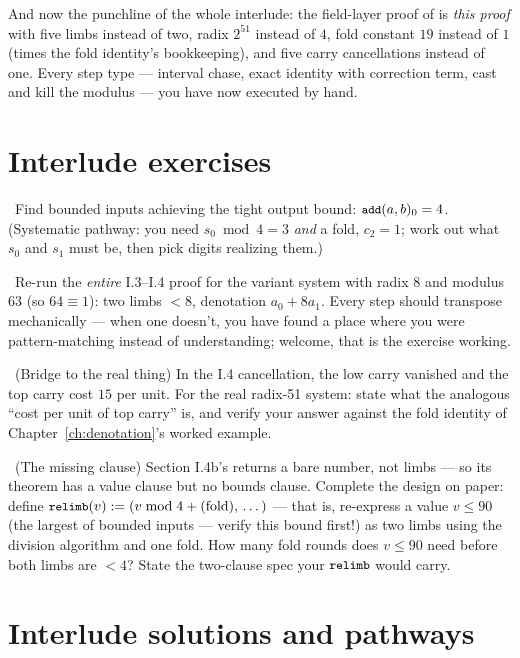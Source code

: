 And now the punchline of the whole interlude: the field-layer proof of
 is \emph{this proof} with five limbs
instead of two, radix $2^{51}$ instead of $4$, fold constant $19$
instead of $1$ (times the fold identity's bookkeeping), and five carry
cancellations instead of one. Every step type --- interval chase, exact
identity with correction term, cast and kill the modulus --- you have
now executed by hand.

\section*{Interlude exercises}

\ Find bounded inputs
achieving the tight output bound: $\code{add}(a,b)_0 = 4$. (Systematic
pathway: you need $s_0 \bmod 4 = 3$ \emph{and} a fold, $c_2 = 1$; work
out what $s_0$ and $s_1$ must be, then pick digits realizing them.)

\smallskip
{}\ Re-run the \emph{entire}
I.3--I.4 proof for the variant system with radix $8$ and modulus $63$
(so $64 \equiv 1$): two limbs $< 8$, denotation $a_0 + 8a_1$. Every step
should transpose mechanically --- when one doesn't, you have found a
place where you were pattern-matching instead of understanding; welcome,
that is the exercise working.

\smallskip
{}\ (Bridge to the real
thing) In the I.4 cancellation, the low carry vanished and the top carry
cost $15$ per unit. For the real radix-51 system: state what the
analogous ``cost per unit of top carry'' is, and verify your answer
against the fold identity of Chapter~\ref{ch:denotation}'s worked
example.

\smallskip
{}\ (The missing clause)
Section I.4b's  returns a bare number, not limbs --- so its
theorem has a value clause but no bounds clause. Complete the design on
paper: define $\code{relimb}(v) := (v \bmod 4 + \text{(fold)},\, \dots)$
--- that is, re-express a value $v \le 90$ (the largest 
of bounded inputs --- verify this bound first!) as two limbs using the
division algorithm and one fold. How many fold rounds does $v \le 90$
need before both limbs are $< 4$? State the two-clause spec your
$\code{relimb}$ would carry.

\section*{Interlude solutions and pathways}
\solutionsintro

